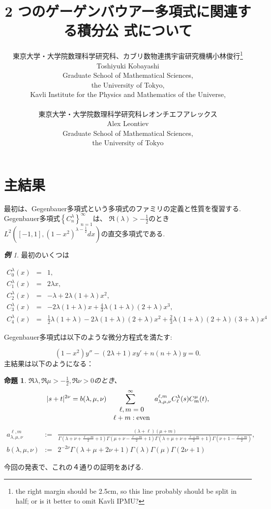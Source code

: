 \documentclass[12pt]{article} %
\title{2 つのゲーゲンバウアー多項式に関連する積分公 式について}
\author{東京大学・大学院数理科学研究科、カブリ数物連携宇宙研究機構\quad 小林\quad 俊行\footnote{
the right margin should be 2.5cm, so this line probably should be split in half; or is it better to omit Kavli IPMU?}\\
Toshiyuki Kobayashi\\
Graduate School of Mathematical Sciences,\\
the University of Tokyo,\\
Kavli Institute for the Physics and Mathematics of the Universe,\\\\
東京大学・大学院数理科学研究科\quad レオンチエフ\quad アレックス\\
Alex Leontiev\\
Graduate School of Mathematical Sciences,\\
the University of Tokyo
}
\date{} %
\newtheorem{prop}{命題}
\theoremstyle{remark}
\newtheorem*{example*}{\textbf{例}}
\newcommand{\tmop}[1]{\ensuremath{\operatorname{#1}}}
\begin{document}
\maketitle

\section{主結果}
	最初は、Gegenbauer多項式という多項式のファミリの定義と性質を復習する.
	Gegenbauer多項式$\left\{ C_n^\lambda \right\}_{n=1}^{\infty}$は、
	$\Re(\lambda)>-\frac{1}{2}$のとき$L^2\left( [-1,1],(1-x^2)^{\lambda-\frac{1}{2}}dx \right)$の直交多項式である.
	
	\begin{example*}
		最初のいくつは
	
		\begin{eqnarray*}
			C_0^\lambda(x)&=&1,\\
			C_1^\lambda(x)&=&2\lambda x,\\
			C_2^\lambda(x)&=&-\lambda+2\lambda(1+\lambda)x^2,\\
			C_3^\lambda(x)&=&-2\lambda(1+\lambda)x+\frac{4}{3}\lambda(1+\lambda)(2+\lambda)x^3,\\
			C_4^\lambda(x)&=&\frac{1}{2}\lambda(1+\lambda)-2\lambda(1+\lambda)(2
			+\lambda)x^2+\frac{2}{3}\lambda(1+\lambda)(2+\lambda)(3+\lambda)x^4
		\end{eqnarray*}
	\end{example*}
	Gegenbauer多項式は以下のような微分方程式を満たす:
		
	\begin{equation*}
		(1-x^2)y''-(2\lambda+1)xy'+n(n+\lambda)y=0.
	\end{equation*}
	主結果は以下のようになる：
	\begin{prop}\label{prop:exp-st-gg}
		$\Re\lambda,\Re\mu>-\frac{1}{2},\Re\nu>0$のとき、
		\begin{equation}
			| s + t |^{2 \nu} =b(\lambda,\mu,\nu) \sum_{\mbox{ $\begin{array}[]{c}
			\ell, m = 0 \\ \ell + m : \tmop{even}
		\end{array}$}}^{\infty} a_{\lambda,\mu,\nu}^{\ell,m} C_\ell^{\lambda} (s) C_m^{\mu} (t),
			\label{eqn:exp-st-gg}
		\end{equation}
		{
			\begin{equation*}
				\begin{array}{rcl}
	a_{\lambda,\mu,\nu}^{\ell,m}&:=&\frac{ (\lambda + \ell) (\mu + m)}{\Gamma \left( \lambda + \nu + \frac{\ell -
	  m}{2} + 1 \right)  \Gamma \left( \mu + \nu -
	  \frac{\ell - m}{2} + 1 \right)\Gamma \left( \lambda + \mu + \nu + \frac{\ell +
	  m}{2} + 1 \right)\Gamma\left(  \nu+1-\frac{\ell+m}{2}\right)},\\[0.4cm]
	  b(\lambda,\mu,\nu)&:=&2^{-2\nu}\Gamma (\lambda + \mu + 2 \nu + 1){\Gamma (\lambda)
	  \Gamma (\mu)\Gamma \left( 2\nu +
	1 \right)}
			\end{array}
			\end{equation*}
	}
	\end{prop}
	今回の発表で、これの４通りの証明をあげる.
\end{document}

